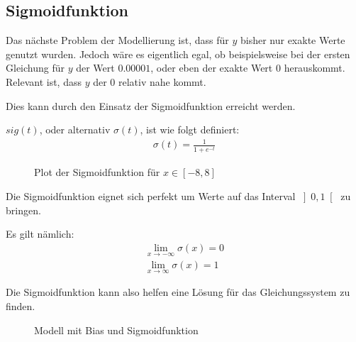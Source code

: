 \subsection{Sigmoidfunktion}
\begin{flushleft}   
Das nächste Problem der Modellierung ist, dass für $y$ bisher nur exakte Werte genutzt wurden.
Jedoch wäre es eigentlich egal, ob beispielsweise bei der ersten Gleichung für $y$ der Wert $0.00001$, oder eben der exakte Wert $0$ herauskommt.
Relevant ist, dass $y$ der $0$ relativ nahe kommt.

Dies kann durch den Einsatz der Sigmoidfunktion erreicht werden.

$sig(t)$, oder alternativ $\sigma(t)$, ist wie folgt definiert:
\begin{align}
    \sigma(t)=\frac{1}{1+e^{-t}}
\end{align}
\end{flushleft}

\begin{figure}[ht]
    \centering
    \caption{Plot der Sigmoidfunktion für $x\in\left[-8,8\right]$}
    \label{fig:sigplot}
\end{figure}

\begin{flushleft}   
Die Sigmoidfunktion eignet sich perfekt um Werte auf das Interval $\left]0,1\right[$ zu bringen.

Es gilt nämlich:
\begin{align}
    \lim_{x\to-\infty} \sigma(x) = 0 \\
    \lim_{x\to\infty} \sigma(x) = 1
\end{align}

Die Sigmoidfunktion kann also helfen eine Lösung für das Gleichungssystem zu finden.
\end{flushleft}

\begin{figure}[ht]
    \centering
    \caption{Modell mit Bias und Sigmoidfunktion}
    \label{fig:net2}
\end{figure}

